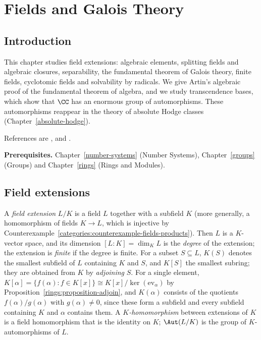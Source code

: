 \chapter{Fields and Galois Theory}\label{fields}

\section{Introduction}\label{fields:section-introduction}

This chapter studies field extensions: algebraic elements, splitting fields and
algebraic closures, separability, the fundamental theorem of Galois theory, finite
fields, cyclotomic fields and solvability by radicals. We give Artin's algebraic proof
of the fundamental theorem of algebra, and we study transcendence bases, which show
that $\CC$ has an enormous group of automorphisms. These automorphisms reappear in the
theory of absolute Hodge classes (Chapter~\ref{absolute-hodge}).

References are \cite{lang-algebra}, \cite{artin-galois} and \cite{stewart-galois}.

\noindent\textbf{Prerequisites.} Chapter~\ref{number-systems} (Number Systems),
Chapter~\ref{groups} (Groups) and Chapter~\ref{rings} (Rings and Modules).

\section{Field extensions}\label{fields:section-extensions}

\begin{definition}\label{fields:definition-extension}
A \emph{field extension} $L/K$ is a field $L$ together with a subfield $K$ (more
generally, a homomorphism of fields $K \to L$, which is injective by
Counterexample~\ref{categories:counterexample-fields-products}). Then $L$ is a
$K$-vector space, and its dimension $[L : K] = \dim_K L$ is the \emph{degree} of the
extension; the extension is \emph{finite} if the degree is finite. For a subset
$S \subseteq L$, $K(S)$ denotes the smallest subfield of $L$ containing $K$ and $S$, and $K[S]$
the smallest subring; they are obtained from $K$ by \emph{adjoining} $S$. For a single element,
$K[\alpha] = \{f(\alpha) : f \in K[x]\} \cong K[x]/\ker(\mathrm{ev}_\alpha)$ by
Proposition~\ref{rings:proposition-adjoin}, and $K(\alpha)$ consists of the quotients $f(\alpha)/g(\alpha)$ with
$g(\alpha) \neq 0$, since these form a subfield and every subfield containing $K$ and $\alpha$ contains
them. A \emph{$K$-homomorphism} between extensions of $K$ is a field
homomorphism that is the identity on $K$; $\Aut(L/K)$ is the group of $K$-automorphisms
of $L$.
\end{definition}

